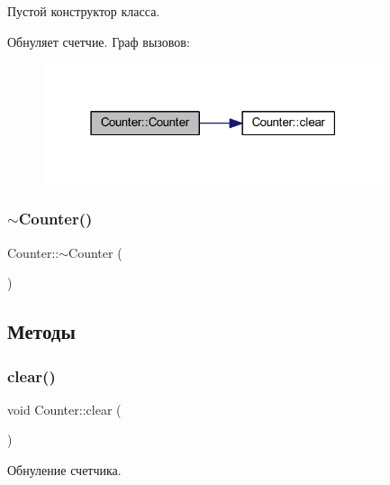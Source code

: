 Пустой конструктор класса. 

Обнуляет счетчие. Граф вызовов\+:\nopagebreak
\begin{figure}[H]
\begin{center}
\leavevmode
\includegraphics[width=283pt]{class_counter_a1e05f69b5240fbab3e7ab351672167f0_cgraph}
\end{center}
\end{figure}
\hypertarget{class_counter_a97f4728470ae8eff37d50ef1d6bb0135}{}\label{class_counter_a97f4728470ae8eff37d50ef1d6bb0135} 
\subsubsection{\texorpdfstring{$\sim$\+Counter()}{~Counter()}}
{\footnotesize\ttfamily Counter\+::$\sim$\+Counter (\begin{DoxyParamCaption}{ }\end{DoxyParamCaption})}



\subsection{Методы}
\hypertarget{class_counter_af66c74ac2bc69fa4f30c34377f869596}{}\label{class_counter_af66c74ac2bc69fa4f30c34377f869596} 
\subsubsection{\texorpdfstring{clear()}{clear()}}
{\footnotesize\ttfamily void Counter\+::clear (\begin{DoxyParamCaption}{ }\end{DoxyParamCaption})}



Обнуление счетчика. 

